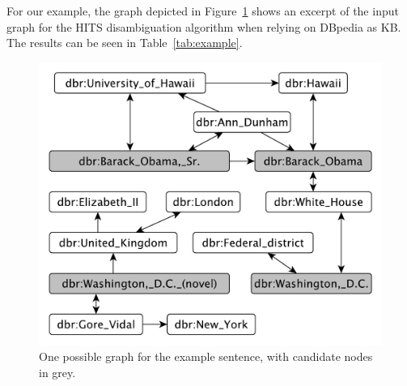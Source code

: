 For our example, the graph depicted in Figure~\ref{fig:example} shows an excerpt of the input graph for the  \ac{HITS} disambiguation algorithm when relying on DBpedia as \ac{KB}. 
The results can be seen in Table~\ref{tab:example}. 

\begin{figure}[tb!]
	\begin{minipage}[b]{0.57\textwidth} 
         \centering
        \includegraphics[width=\linewidth]{part_02/unstructured_annotation/fig/exampleGraph.pdf}
        \caption{One possible graph for the example sentence, with candidate nodes in grey.}
        \label{fig:example}
    \end{minipage}
	\hfill
	\begin{minipage}[b]{0.42\textwidth}
        \centering
\end{minipage}
\end{figure}
